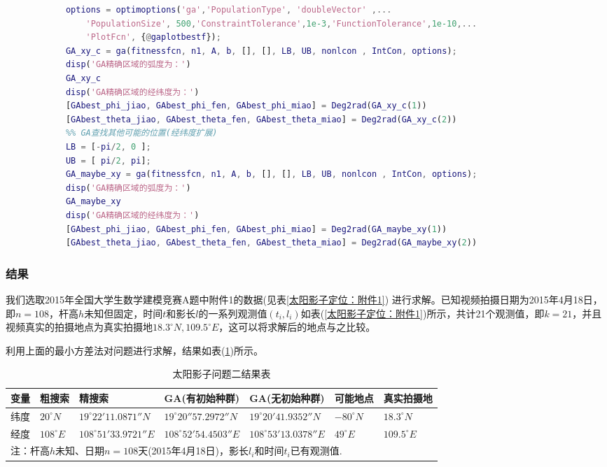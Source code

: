 \begin{lstlisting}[language = Matlab]
            %% 不设置初始种群的GA查找
            options = optimoptions('ga','PopulationType', 'doubleVector' ,...
                'PopulationSize', 500,'ConstraintTolerance',1e-3,'FunctionTolerance',1e-10,...
                'PlotFcn', {@gaplotbestf});
            GA_xy_c = ga(fitnessfcn, n1, A, b, [], [], LB, UB, nonlcon , IntCon, options);
            disp('GA精确区域的弧度为：')
            GA_xy_c
            disp('GA精确区域的经纬度为：')
            [GAbest_phi_jiao, GAbest_phi_fen, GAbest_phi_miao] = Deg2rad(GA_xy_c(1))
            [GAbest_theta_jiao, GAbest_theta_fen, GAbest_theta_miao] = Deg2rad(GA_xy_c(2))
            %% GA查找其他可能的位置(经纬度扩展)
            LB = [-pi/2, 0 ];
            UB = [ pi/2, pi];
            GA_maybe_xy = ga(fitnessfcn, n1, A, b, [], [], LB, UB, nonlcon , IntCon, options);
            disp('GA精确区域的弧度为：')
            GA_maybe_xy
            disp('GA精确区域的经纬度为：')
            [GAbest_phi_jiao, GAbest_phi_fen, GAbest_phi_miao] = Deg2rad(GA_maybe_xy(1))
            [GAbest_theta_jiao, GAbest_theta_fen, GAbest_theta_miao] = Deg2rad(GA_maybe_xy(2))
            \end{lstlisting}
        \subsubsection{结果}
            \par
            我们选取2015年全国大学生数学建模竞赛A题中附件1的数据(见表\ref{太阳影子定位：附件1})
            进行求解。已知视频拍摄日期为2015年4月18日，即$n=108$，杆高$h$未知但固定，时间$t$和影长$l$的一系列观测值$(t_i,l_i )$如表(\ref{太阳影子定位：附件1})所示，共计21个观测值，即$k=21$，并且视频真实的拍摄地点为真实拍摄地$18.3^\circ N,109.5^\circ E$，这可以将求解后的地点与之比较。
            \par
            利用上面的最小方差法对问题进行求解，结果如表(\ref{太阳影子问题二结果表})所示。
        \begin{table}[H]
        \small
        \centering
        \caption{太阳影子问题二结果表}
        \label{太阳影子问题二结果表}
        \begin{tabular}{lllllll}
        \toprule
        变量 & 粗搜索 & 精搜索 & GA(有初始种群) & GA(无初始种群)&可能地点 & 真实拍摄地\\
        \midrule
        纬度 & $20^\circ N$ & $19^\circ 22' 11.0871''N$ & $19^\circ 20'' 57.2972''N$ & $19^\circ 20' 41.9352'' N$& $-80^\circ N$ & $18.3^\circ N$\\
        经度 & $108^\circ E$ & $108^\circ 51' 33.9721'' E$ & $108^\circ 52' 54.4503''E$ &  $108^\circ 53' 13.0378''E$& $49^\circ E$ &$109.5^\circ E$\\
        \bottomrule
        \multicolumn{7}{l}{\footnotesize 注：杆高$h$未知、日期$n=108$天(2015年4月18日)，影长$l_i$和时间$t_i$已有观测值.}\\
        \end{tabular}
        \end{table}


